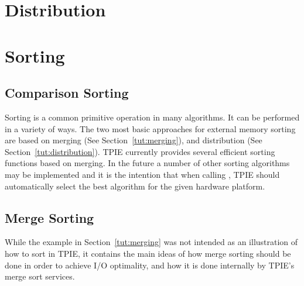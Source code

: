 
\section{Distribution} 

\tobewritten


%


\section{Sorting}
\label{tut:sorting}
\subsection{Comparison Sorting} 

Sorting is a common primitive operation in many algorithms.
It can be performed in a variety of ways. The two most basic
approaches for external memory sorting are based on merging
(See Section~\ref{tut:merging}), and distribution (See
Section~\ref{tut:distribution}).
TPIE currently provides several efficient sorting functions
based on merging.  In the future a number of other sorting
algorithms may be implemented and it is the intention that
when calling , TPIE should automatically
select the best algorithm for the given hardware platform.

\subsection{Merge Sorting} 
While the  example in
Section~\ref{tut:merging} was not intended as an
illustration of how to sort in TPIE, it contains the main
ideas of how merge sorting should be done in order to
achieve I/O optimality, and how it is done internally by
TPIE's merge sort services.

